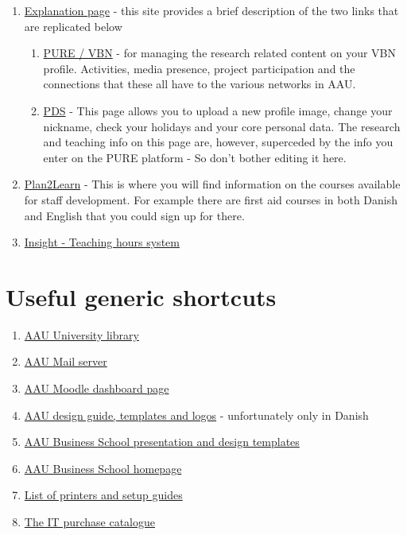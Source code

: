 \documentclass[
]{book}
\begin{document}
\begin{enumerate}
\def\labelenumi{\arabic{enumi}.}
\item
  \href{https://www.en.its.aau.dk/instructions/staff-profile}{Explanation page} - this site provides a brief description of the two links that are replicated below

  \begin{enumerate}
  \def\labelenumii{\alph{enumii}.}
  \item
    \href{https://vbn.aau.dk/admin/workspace/personal/overview/}{PURE / VBN} - for managing the research related content on your VBN profile. Activities, media presence, project participation and the connections that these all have to the various networks in AAU.
  \item
    \href{https://www.its.aau.dk/vejledninger/medarbejderprofil}{PDS} - This page allows you to upload a new profile image, change your nickname, check your holidays and your core personal data. The research and teaching info on this page are, however, superceded by the info you enter on the PURE platform - So don't bother editing it here.
  \end{enumerate}
\item
  \href{https://aau.plan2learn.dk/default.aspx?lang=en}{Plan2Learn} - This is where
  you will find information on the courses available for staff development. For
  example there are first aid courses in both Danish and English that you could
  sign up for there.
\item
  \href{https://apps.powerapps.com/play/6050b6e6-8414-4bef-8f28-6f41944878cd?tenantId=f5dbba49-ce06-496f-ac3e-0cf14361d934\&source=email\&hint=08e5ae4b-a9f2-41c1-9774-945ccbf54ae4}{Insight - Teaching hours system}
\end{enumerate}

\hypertarget{useful-generic-shortcuts}{%
\section{Useful generic shortcuts}\label{useful-generic-shortcuts}}

\begin{enumerate}
\def\labelenumi{\arabic{enumi}.}
\item
  \href{http://www.aub.aau.dk/}{AAU University library}
\item
  \href{mail.aau.dk}{AAU Mail server}
\item
  \href{https://www.moodle.aau.dk/my/}{AAU Moodle dashboard page}
\item
  \href{https://www.design.aau.dk}{AAU design guide, templates and logos} - unfortunately only in Danish
\item
  \href{https://www.intranet.business.aau.dk/business-school-design-materials}{AAU Business School presentation and design templates}
\item
  \href{https://www.business.aau.dk}{AAU Business School homepage}
\item
  \href{https://www.its.aau.dk/vejledninger/Printkopi/find-printere/}{List of printers and setup guides}
\item
  \href{https://www.en.ekstranet.its.aau.dk/purchase}{The IT purchase catalogue}
\end{enumerate}
\end{document}
